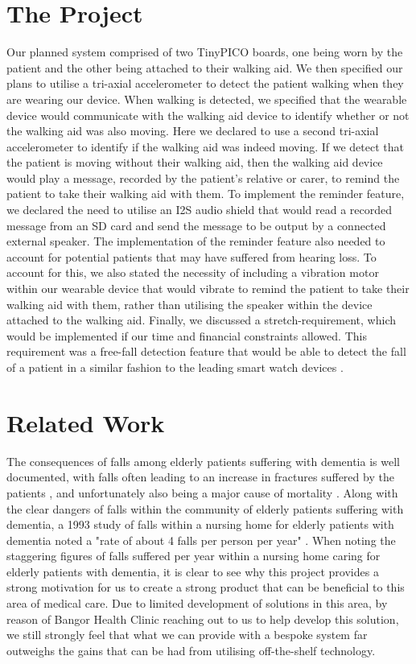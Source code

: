 \documentclass[12pt, a4paper]{report}
\begin{document}
\section{The Project}

Our planned system comprised of two TinyPICO boards, one being worn by the patient and the other being attached to their walking aid. We then specified our plans to utilise a tri-axial accelerometer to detect the patient walking when they are wearing our device. When walking is detected, we specified that the wearable device would communicate with the walking aid device to identify whether or not the walking aid was also moving. Here we declared to use a second tri-axial accelerometer to identify if the walking aid was indeed moving. If we detect that the patient is moving without their walking aid, then the walking aid device would play a message, recorded by the patient's relative or carer, to remind the patient to take their walking aid with them. To implement the reminder feature, we declared the need to utilise an I2S audio shield that would read a recorded message from an SD card and send the message to be output by a connected external speaker. The implementation of the reminder feature also needed to account for potential patients that may have suffered from hearing loss. To account for this, we also stated the necessity of including a vibration motor within our wearable device that would vibrate to remind the patient to take their walking aid with them, rather than utilising the speaker within the device attached to the walking aid. Finally, we discussed a stretch-requirement, which would be implemented if our time and financial constraints allowed. This requirement was a free-fall detection feature that would be able to detect the fall of a patient in a similar fashion to the leading smart watch devices \cite{samsung_watch, apple_watch}.

\section{Related Work}

The consequences of falls among elderly patients suffering with dementia is well documented, with falls often leading to an increase in fractures suffered by the patients \cite{buchner_1987}, and unfortunately also being a major cause of mortality \cite{shaw_2007}. Along with the clear dangers of falls within the community of elderly patients suffering with dementia, a 1993 study of falls within a nursing home for elderly patients with dementia noted a "rate of about 4 falls per person per year" \cite{van_dijk_meulenberg_van_de_sande_habbema_1993}. When noting the staggering figures of falls suffered per year within a nursing home caring for elderly patients with dementia, it is clear to see why this project provides a strong motivation for us to create a strong product that can be beneficial to this area of medical care. Due to limited development of solutions in this area, by reason of Bangor Health Clinic reaching out to us to help develop this solution, we still strongly feel that what we can provide with a bespoke system far outweighs the gains that can be had from utilising off-the-shelf technology. 
\end{document}
